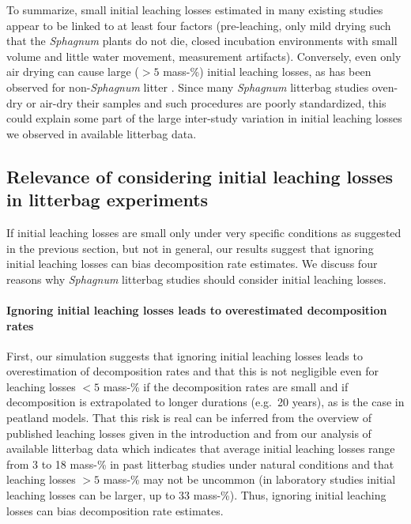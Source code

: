 \documentclass[bg, manuscript]{copernicus}
\begin{document}
To summarize, small initial leaching losses estimated in many existing studies appear to be linked to at least four factors (pre-leaching, only mild drying such that the \emph{Sphagnum} plants do not die, closed incubation environments with small volume and little water movement, measurement artifacts). Conversely, even only air drying can cause large (\(>5\) mass-\%) initial leaching losses, as has been observed for non-\emph{Sphagnum} litter \citep[e.g.,][]{Barlocher.1997}. Since many \emph{Sphagnum} litterbag studies oven-dry or air-dry their samples and such procedures are poorly standardized, this could explain some part of the large inter-study variation in initial leaching losses we observed in available litterbag data.











\hypertarget{out-discussion-3}{%
\subsection{Relevance of considering initial leaching losses in litterbag experiments}\label{out-discussion-3}}

If initial leaching losses are small only under very specific conditions as suggested in the previous section, but not in general, our results suggest that ignoring initial leaching losses can bias decomposition rate estimates. We discuss four reasons why \emph{Sphagnum} litterbag studies should consider initial leaching losses.

\paragraph*{Ignoring initial leaching losses leads to overestimated decomposition rates}

First, our simulation suggests that ignoring initial leaching losses leads to overestimation of decomposition rates and that this is not negligible even for leaching losses \(<5\) mass-\% if the decomposition rates are small and if decomposition is extrapolated to longer durations (e.g.~20 years), as is the case in peatland models. That this risk is real can be inferred from the overview of published leaching losses given in the introduction and from our analysis of available litterbag data which indicates that average initial leaching losses range from 3 to 18 mass-\% in past litterbag studies under natural conditions and that leaching losses \(>5\) mass-\% may not be uncommon (in laboratory studies \citep{Bengtsson.2017} initial leaching losses can be larger, up to 33 mass-\%). Thus, ignoring initial leaching losses can bias decomposition rate estimates.
\end{document}
